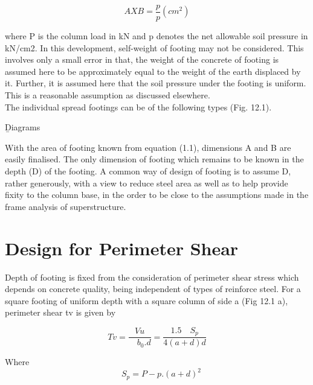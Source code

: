 \documentclass{book}
\begin{document}
\begin{equation}
AXB =\frac{p}{p} (cm^2)
\end{equation}

where P is the column load in kN and p denotes the net allowable soil pressure in kN/cm2. In
this development, self-weight of footing may not be considered. This involves only a small error
in that, the weight of the concrete of footing is assumed here to be approximately equal to the
weight of the earth displaced by it. Further, it is assumed here that the soil pressure under
the footing is uniform. This is a reasonable assumption as discussed elsewhere.\\
The individual spread footings can be of the following types (Fig. 12.1).
\newpage

\b Diagrams
\par With the area of footing known from equation (1.1), dimensions A and B are easily finalised. The only dimension of footing which remains to be known in the depth (D) of the footing. A common way of design of footing is to assume D, rather generously, with a view to reduce steel area as well as to help provide fixity to the column base, in the order to be close to the assumptions made in the frame analysis of superstructure.

\section{Design for Perimeter Shear}
\par Depth of footing is fixed from the consideration of perimeter shear stress which depends on concrete quality, being independent of types of reinforce steel. For a square footing of uniform depth with a square column of side a (Fig 12.1 a), perimeter shear tv is given by

\begin{equation}
Tv = \frac{Vu} {\quad{b_0}.d} 
=\frac{1.5 \quad S_p} {4(a+d)d} 
\end{equation}

Where 
\begin{equation}
\quad S_p = P-p . (a+d)^2
\end{equation}
\end{document}
